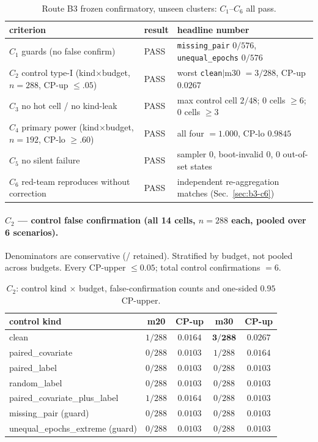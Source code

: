 \begin{table}[t]
\centering
\caption{Route B3 frozen confirmatory, unseen clusters: $C_1$--$C_6$ all pass.}
\label{tab:b3criteria}
\begin{tabularx}{\linewidth}{@{}llX@{}}
\toprule
criterion & result & headline number \\
\midrule
$C_1$ guards (no false confirm) & PASS & \texttt{missing\_pair} $0/576$, \texttt{unequal\_epochs} $0/576$ \\
$C_2$ control type-I (kind$\times$budget, $n{=}288$, CP-up $\leq .05$) & PASS & worst \texttt{clean}$|$m30 $=3/288$, CP-up $\mathbf{0.0267}$ \\
$C_3$ no hot cell / no kind-leak & PASS & max control cell $2/48$; $0$ cells $\geq 6$; $0$ cells $\geq 3$ \\
$C_4$ primary power (kind$\times$budget, $n{=}192$, CP-lo $\geq .60$) & PASS & all four $=\mathbf{1.000}$, CP-lo $\mathbf{0.9845}$ \\
$C_5$ no silent failure & PASS & sampler $0$, boot-invalid $0$, $0$ out-of-set states \\
$C_6$ red-team reproduces without correction & PASS & independent re-aggregation matches (Sec.~\ref{sec:b3-c6}) \\
\bottomrule
\end{tabularx}
\end{table}

\paragraph{$C_2$ --- control false confirmation (all 14 cells, $n=288$ each, pooled over 6 scenarios).}
Denominators are conservative (\stneed{}/\stinv{} retained). Stratified by budget, not pooled across
budgets. Every CP-upper $\leq 0.05$; total control confirmations $=6$.

\begin{table}[t]
\centering
\caption{$C_2$: control kind $\times$ budget, false-confirmation counts and one-sided $0.95$ CP-upper.}
\label{tab:b3c2}
\begin{tabular}{@{}lcccc@{}}
\toprule
control kind & m20 & CP-up & m30 & CP-up \\
\midrule
clean                          & $1/288$ & $0.0164$ & $\mathbf{3/288}$ & $\mathbf{0.0267}$ \\
paired\_covariate              & $0/288$ & $0.0103$ & $1/288$ & $0.0164$ \\
paired\_label                  & $0/288$ & $0.0103$ & $0/288$ & $0.0103$ \\
random\_label                  & $0/288$ & $0.0103$ & $0/288$ & $0.0103$ \\
paired\_covariate\_plus\_label & $1/288$ & $0.0164$ & $0/288$ & $0.0103$ \\
missing\_pair (guard)          & $0/288$ & $0.0103$ & $0/288$ & $0.0103$ \\
unequal\_epochs\_extreme (guard)& $0/288$ & $0.0103$ & $0/288$ & $0.0103$ \\
\bottomrule
\end{tabular}
\end{table}

